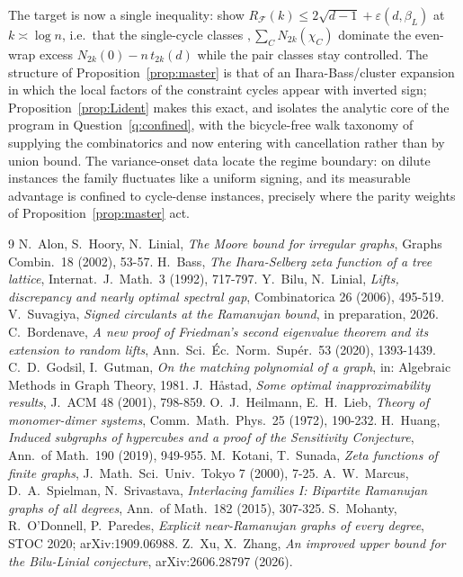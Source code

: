 \documentclass[11pt]{article}
\theoremstyle{remark}
\begin{document}
The target is now a single inequality: show
$R_{\mathcal F}(k)\le2\sqrt{d-1}+\varepsilon(d,\beta_L)$ at
$k\asymp\log n$, i.e.\ that the single-cycle classes 
$,\sum_{C}N_{2k}(\chi_C)$ dominate the even-wrap excess
$N_{2k}(0)-n\,t_{2k}(d)$ while the pair classes stay controlled. The
structure of Proposition~\ref{prop:master} is that of an
Ihara-Bass/cluster expansion in which the local factors of the
constraint cycles appear with inverted sign; Proposition~\ref{prop:Lident}
makes this exact, and isolates the analytic core of the program in
Question~\ref{q:confined}, with the bicycle-free walk taxonomy of
\cite{mop20} supplying the combinatorics
and now entering with cancellation rather than by union bound. The variance-onset data locate the regime boundary: on dilute
instances the family fluctuates like a uniform signing, and its
measurable advantage is confined to cycle-dense instances, 
precisely where the parity weights of Proposition~\ref{prop:master}
act.

\begin{thebibliography}{9}
 N.~Alon, S.~Hoory, N.~Linial, \emph{The Moore bound
for irregular graphs}, Graphs Combin.~18 (2002), 53-57.
 H.~Bass, \emph{The Ihara-Selberg zeta function of a
tree lattice}, Internat.~J.~Math.~3 (1992), 717-797.
 Y.~Bilu, N.~Linial,
\emph{Lifts, discrepancy and nearly optimal spectral gap},
Combinatorica 26 (2006), 495-519.
 V.~Suvagiya, \emph{Signed circulants at the Ramanujan
bound}, in preparation, 2026.
 C.~Bordenave, \emph{A new proof of Friedman's
second eigenvalue theorem and its extension to random lifts},
Ann.~Sci.~\'Ec.~Norm.~Sup\'er.~53 (2020), 1393-1439.
 C.~D.~Godsil, I.~Gutman,
\emph{On the matching polynomial of a graph}, in: Algebraic Methods in
Graph Theory, 1981.
 J.~H\aa stad, \emph{Some optimal inapproximability
results}, J.~ACM 48 (2001), 798-859.
 O.~J.~Heilmann, E.~H.~Lieb,
\emph{Theory of monomer-dimer systems}, Comm.~Math.~Phys.~25 (1972),
190-232.
 H.~Huang, \emph{Induced subgraphs of hypercubes and a
proof of the Sensitivity Conjecture}, Ann.~of Math.~190 (2019), 949-955.
 M.~Kotani, T.~Sunada, \emph{Zeta functions of finite
graphs}, J.~Math.~Sci.~Univ.~Tokyo 7 (2000), 7-25.
 A.~W.~Marcus, D.~A.~Spielman, N.~Srivastava,
\emph{Interlacing families I: Bipartite Ramanujan graphs of all degrees},
Ann.~of Math.~182 (2015), 307-325.
 S.~Mohanty, R.~O'Donnell, P.~Paredes,
\emph{Explicit near-Ramanujan graphs of every degree}, STOC 2020;
arXiv:1909.06988.
 Z.~Xu, X.~Zhang, \emph{An improved upper bound for
the Bilu-Linial conjecture}, arXiv:2606.28797 (2026).
\end{thebibliography}
\end{document}

